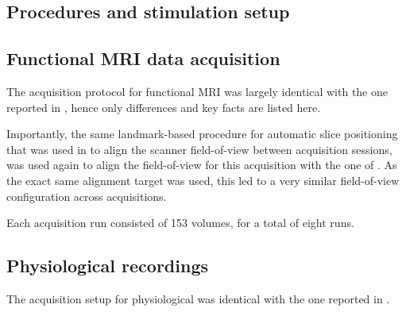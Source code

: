 \subsection*{Procedures and stimulation setup}

\subsection*{Functional MRI data acquisition}
The acquisition protocol for functional MRI was largely identical with the one reported in \citet{Hanke_2014}, hence only differences and key facts are listed here.

Importantly, the same landmark-based procedure for automatic slice positioning that was used in \citet{Hanke_2014} to align the scanner field-of-view between acquisition sessions, was used again to align the field-of-view for this acquisition with the one of \citet{Hanke_2014}. As the exact same alignment target was used, this led to a very similar field-of-view configuration across acquisitions.

Each acquisition run consisted of 153 volumes, for a total of eight runs.

\subsection*{Physiological recordings}
The acquisition setup for physiological was identical with the one reported in \citet{Hanke_2014}.
